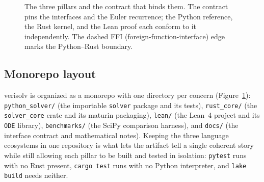 \documentclass[sigplan,nonacm,screen]{acmart}
\begin{document}
\begin{figure}[t]
\centering
{}
\caption{The three pillars and the contract that binds them. The contract pins
the interfaces and the Euler recurrence; the Python reference, the Rust kernel,
and the Lean proof each conform to it independently. The dashed FFI
(foreign-function-interface) edge marks the Python--Rust boundary.}
\label{fig:arch}
\end{figure}

\subsection{Monorepo layout}
verisolv is organized as a monorepo with one directory per concern
(Figure~\ref{fig:arch}):
\texttt{python\_solver/} (the importable \texttt{solver} package and its tests),
\texttt{rust\_core/} (the \texttt{solver\_core} crate and its maturin packaging),
\texttt{lean/} (the Lean~4 project and its \texttt{ODE} library),
\texttt{benchmarks/} (the SciPy comparison harness), and \texttt{docs/} (the
interface contract and mathematical notes). Keeping the three language
ecosystems in one repository is what lets the artifact tell a single coherent
story while still allowing each pillar to be built and tested in isolation:
\texttt{pytest} runs with no Rust present, \texttt{cargo test} runs with no
Python interpreter, and \texttt{lake build} needs neither.
\end{document}
